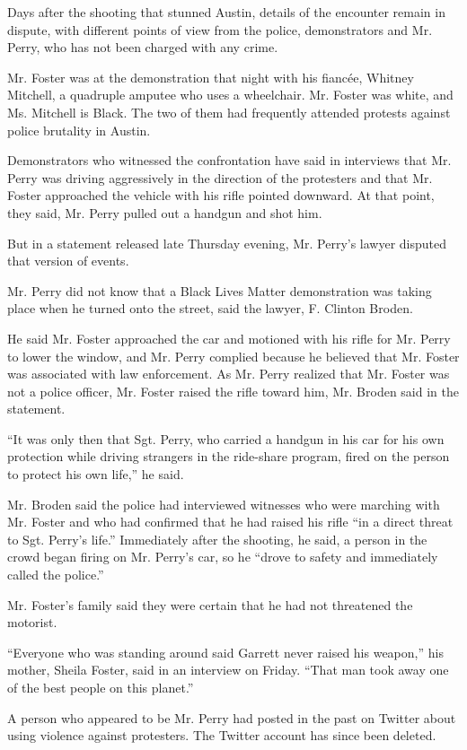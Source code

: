 Days after the shooting that stunned Austin, details of the encounter
remain in dispute, with different points of view from the police,
demonstrators and Mr. Perry, who has not been charged with any crime.

Mr. Foster was at the demonstration that night with his fiancée, Whitney
Mitchell, a quadruple amputee who uses a wheelchair. Mr. Foster was
white, and Ms. Mitchell is Black. The two of them had frequently
attended protests against police brutality in Austin.

Demonstrators who witnessed the confrontation have said in interviews
that Mr. Perry was driving aggressively in the direction of the
protesters and that Mr. Foster approached the vehicle with his rifle
pointed downward. At that point, they said, Mr. Perry pulled out a
handgun and shot him.

But in a statement released late Thursday evening, Mr. Perry's lawyer
disputed that version of events.

Mr. Perry did not know that a Black Lives Matter demonstration was
taking place when he turned onto the street, said the lawyer, F. Clinton
Broden.

He said Mr. Foster approached the car and motioned with his rifle for
Mr. Perry to lower the window, and Mr. Perry complied because he
believed that Mr. Foster was associated with law enforcement. As Mr.
Perry realized that Mr. Foster was not a police officer, Mr. Foster
raised the rifle toward him, Mr. Broden said in the statement.

``It was only then that Sgt. Perry, who carried a handgun in his car for
his own protection while driving strangers in the ride-share program,
fired on the person to protect his own life,'' he said.

Mr. Broden said the police had interviewed witnesses who were marching
with Mr. Foster and who had confirmed that he had raised his rifle ``in
a direct threat to Sgt. Perry's life.'' Immediately after the shooting,
he said, a person in the crowd began firing on Mr. Perry's car, so he
``drove to safety and immediately called the police.''

Mr. Foster's family said they were certain that he had not threatened
the motorist.

``Everyone who was standing around said Garrett never raised his
weapon,'' his mother, Sheila Foster, said in an interview on Friday.
``That man took away one of the best people on this planet.''

A person who appeared to be Mr. Perry had posted in the past on Twitter
about using violence against protesters. The Twitter account has since
been deleted.

